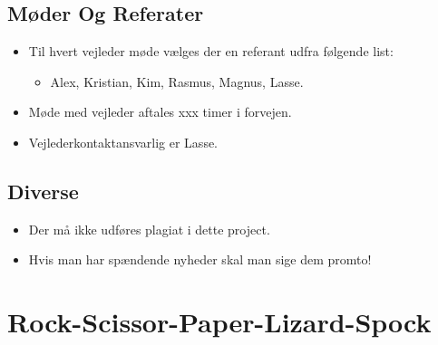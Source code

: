 \documentclass{article}
\begin{document}
\subsection{Møder Og Referater}
\begin{itemize}
	\item Til hvert vejleder møde vælges der en referant udfra følgende list:
	\begin{itemize}
		\item Alex, Kristian, Kim, Rasmus, Magnus, Lasse.
	\end{itemize}
	\item Møde med vejleder aftales xxx timer i forvejen.
	\item Vejlederkontaktansvarlig er Lasse. 
\end{itemize}

\subsection{Diverse}
\begin{itemize}
	\item Der må ikke udføres plagiat i dette project.
	\item Hvis man har spændende nyheder skal man sige dem promto!
\end{itemize}

\appendix
\section{Rock-Scissor-Paper-Lizard-Spock}
\label{app:game}
\end{document}
